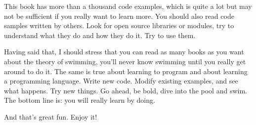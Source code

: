 This book has more than a thousand code examples, which is quite 
a lot but may not be sufficient if you really want to learn more. 
You should also read code samples written by others. Look for 
open source libraries or modules, try to understand what they 
do and how they do it. Try to use them.

Having said that, I should stress that you can read as many books 
as you want about the theory of swimming, you'll never know 
swimming until you really get around to do it. The same is true 
about learning to program and about learning a programming 
language. Write new code. Modify existing examples, and see what 
happens. Try new things. Go ahead, be bold, dive into the pool and
swim. The bottom line is: you will really learn by doing.

And that's great fun. Enjoy it!

